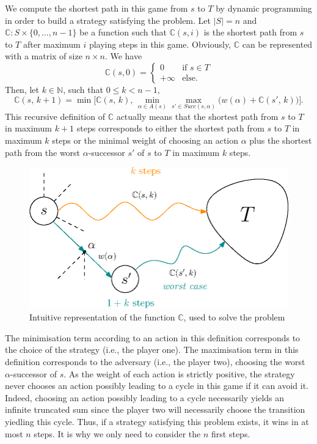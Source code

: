 We compute the shortest path in this game from $s$ to $T$ by dynamic programming in order to build a strategy satisfying the \SPG{} problem.
Let $|S| = n$ and $\mathbb{C}: S \times \{0, \dots, n-1 \}$ be a function such that $\mathbb{C}(s, i)$ is the shortest path from $s$ to $T$ after maximum
$i$ playing steps in this game.
Obviously, $\mathbb{C}$ can be represented with a matrix of size $n \times n$.
We have \[\mathbb{C}(s, 0) = \begin{cases}
  0 & \text{if } s \in T\\
  +\infty & \text{else}.
\end{cases}\]
Then, let $k \in \mathbb{N}$, such that $0 \leq k < n - 1$,
\[
  \mathbb{C}(s,\, k+1) = \min \big[\mathbb{C}(s,\, k),\, \min_{\alpha \in A(s)} \max_{s' \in Succ(s,\alpha)} \big(w(\alpha) + \mathbb{C}(s',\, k)\big)\big].
\]
This recursive definition of $\mathbb{C}$ actually means that the shortest path from $s$ to $T$ in maximum $k+1$ steps corresponds to either the shortest path from $s$ to $T$ in maximum $k$ steps or the minimal weight of choosing an action $\alpha$ plus the shortest path from the worst $\alpha$-successor $s'$ of $s$ to $T$ in maximum $k$ steps.
\begin{figure}[h]
  \centering
  \includegraphics[width=0.6\linewidth]{resources/sp-g}
  \captionsetup{justification=centering}
  \caption{Intuitive representation of  the function $\mathbb{C}$, used to solve the \SPG{} problem}
\end{figure}
The minimisation term according to an action in this definition corresponds to the choice of the strategy (i.e., the player one).
The maximisation term in this definition corresponds to the adversary (i.e., the player two), choosing the worst $\alpha$-successor of $s$.
As the weight of each action is strictly positive, the strategy never chooses an action possibly leading to a  cycle in this game if it can avoid it.
Indeed, choosing an action possibly leading to a cycle necessarily yields an infinite truncated sum since the player two will necessarily choose the transition yiedling this cycle.
Thus, if a strategy satisfying this problem exists, it wins in at most $n$ steps. It is why we only need to consider the $n$ first steps.

